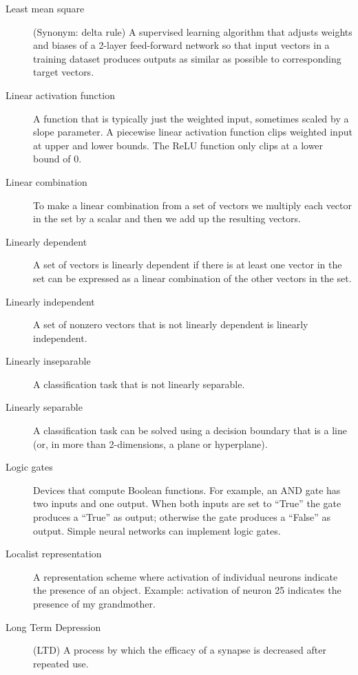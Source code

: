 \begin{description}
\item[Least mean square] (Synonym: delta rule) A supervised learning algorithm that adjusts weights and biases of a 2-layer feed-forward network so that input vectors in a training dataset produces outputs as similar as possible to corresponding target vectors.

\item[Linear activation function] A function that is typically just the weighted input, sometimes scaled by a slope parameter. A piecewise linear activation function clips weighted input at  upper and lower bounds. The ReLU function only clips at a lower bound of 0.

\item[Linear combination] To make a linear combination from a set of vectors we multiply each vector in the set by a scalar and then we add up the resulting vectors.

\item[Linearly dependent] A set of vectors is linearly dependent if there is at least one vector in the set can be expressed as a linear combination of the other vectors in the set.

\item[Linearly independent] A set of nonzero vectors that is not linearly
dependent is linearly independent.

\item[Linearly inseparable] A classification task that is not linearly separable.

\item[Linearly separable] A classification task can be solved using a decision boundary that is a line (or, in more than 2-dimensions, a plane or hyperplane).

\item[Logic gates] Devices that compute Boolean functions. For example, an AND gate has two inputs and one output. When both inputs are set to ``True'' the gate produces a ``True'' as output; otherwise the gate produces a ``False'' as output. Simple neural networks can implement logic gates.

\item[Localist representation] A representation scheme where activation of individual neurons indicate the presence of an object. Example: activation of neuron 25 indicates the presence of my grandmother.

\item[Long Term Depression] (LTD) A  process by which the efficacy of a synapse is decreased after repeated use.


\end{description}
